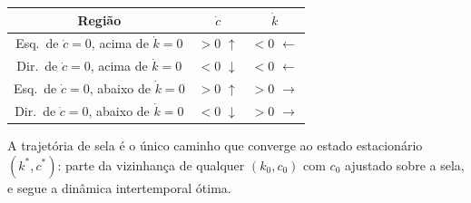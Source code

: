 \documentclass[11pt,a4paper]{article}
\begin{document}
\medskip
\begin{center}
\small
\begin{tabular}{ccc}
\hline
Regi\~ao & $\dot c$ & $\dot k$ \\
\hline
Esq.\ de $\dot c=0$, acima de $\dot k=0$ & $> 0$ $\uparrow$ & $< 0$ $\leftarrow$ \\
Dir.\ de $\dot c=0$, acima de $\dot k=0$ & $< 0$ $\downarrow$ & $< 0$ $\leftarrow$ \\
Esq.\ de $\dot c=0$, abaixo de $\dot k=0$ & $> 0$ $\uparrow$ & $> 0$ $\rightarrow$ \\
Dir.\ de $\dot c=0$, abaixo de $\dot k=0$ & $< 0$ $\downarrow$ & $> 0$ $\rightarrow$ \\
\hline
\end{tabular}
\end{center}

\medskip
A trajet\'oria de sela \'e o \'unico caminho que converge ao estado estacion\'ario
$(k^*, c^*)$: parte da vizinhança de qualquer $(k_0, c_0)$ com $c_0$ ajustado
sobre a sela, e segue a din\^amica intertemporal \'otima.
\end{document}
